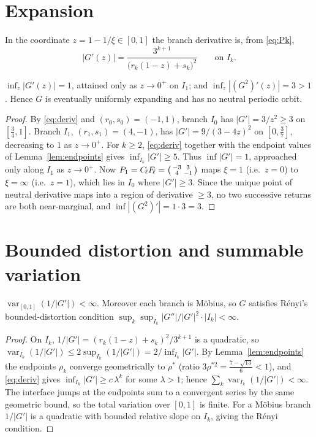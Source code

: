 \documentclass[11pt]{article}
\theoremstyle{definition}\newtheorem{definition}{Definition}
\theoremstyle{remark}\newtheorem{remark}{Remark}
\DeclareMathOperator{\var}{var}
\begin{document}
\section{Expansion}
In the coordinate $z=1-1/\xi\in[0,1]$ the branch derivative is, from
\eqref{eq:Pk},
\begin{equation}\label{eq:deriv}
|G'(z)|=\frac{3^{k+1}}{\bigl(r_k(1-z)+s_k\bigr)^2}\qquad\text{on }I_k .
\end{equation}
\begin{lemma}\label{lem:exp}
$\inf_z|G'(z)|=1$, attained only as $z\to0^+$ on $I_1$; and
$\inf_z|(G^2)'(z)|=3>1$. Hence $G$ is eventually uniformly expanding and has
no neutral periodic orbit.
\end{lemma}
\begin{proof}
By \eqref{eq:deriv} and $(r_0,s_0)=(-1,1)$, branch $I_0$ has
$|G'|=3/z^2\ge3$ on $[\tfrac34,1]$. Branch $I_1$, $(r_1,s_1)=(4,-1)$, has
$|G'|=9/(3-4z)^2$ on $[0,\tfrac37]$, decreasing to $1$ as $z\to0^+$.
For $k\ge2$, \eqref{eq:deriv} together with the endpoint values of
Lemma~\ref{lem:endpoints} gives $\inf_{I_k}|G'|\ge5$. Thus $\inf|G'|=1$,
approached only along $I_1$ as $z\to0^+$. Now
$P_1=C_{\!\ell}F_{\!\ell}=\begin{psmallmatrix}-3&3\\4&-1\end{psmallmatrix}$
maps $\xi=1$ (i.e.\ $z=0$) to $\xi=\infty$ (i.e.\ $z=1$), which lies in
$I_0$ where $|G'|\ge3$. Since the unique point of neutral derivative maps
into a region of derivative $\ge3$, no two successive returns are both
near-marginal, and $\inf|(G^2)'|=1\cdot3=3$.
\end{proof}

\section{Bounded distortion and summable variation}
\begin{lemma}\label{lem:var}
$\var_{[0,1]}(1/|G'|)<\infty$. Moreover each branch is M\"obius, so $G$
satisfies R\'enyi's bounded-distortion condition
$\sup_k\sup_{I_k}|G''|/|G'|^2\cdot|I_k|<\infty$.
\end{lemma}
\begin{proof}
On $I_k$, $1/|G'|=(r_k(1-z)+s_k)^2/3^{k+1}$ is a quadratic, so
$\var_{I_k}(1/|G'|)\le 2\sup_{I_k}(1/|G'|)=2/\inf_{I_k}|G'|$. By
Lemma~\ref{lem:endpoints} the endpoints $\rho_k$ converge geometrically to
$\rho^\ast$ (ratio $3\rho^{\ast2}=\tfrac{7-\sqrt{13}}{6}<1$), and
\eqref{eq:deriv} gives $\inf_{I_k}|G'|\ge c\,\lambda^{k}$ for some
$\lambda>1$; hence $\sum_k\var_{I_k}(1/|G'|)<\infty$. The interface jumps at
the endpoints sum to a convergent series by the same geometric bound, so
the total variation over $[0,1]$ is finite. For a M\"obius branch
$1/|G'|$ is a quadratic with bounded relative slope on $I_k$, giving the
R\'enyi condition.
\end{proof}
\end{document}
